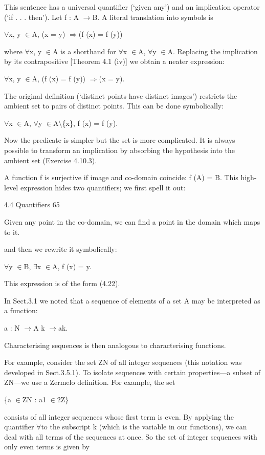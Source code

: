 \documentclass[11pt]{article}
\theoremstyle{plain}
\theoremstyle{definition}
\begin{document}
This sentence has a universal quantifier (`given any') and an implication operator (`if . . . then'). Let f : A $\to$B. A literal translation into symbols is

$\forall$x, y $\in$A, (x = y) $\Rightarrow$(f (x) = f (y))

where $\forall$x, y $\in$A is a shorthand for $\forall$x $\in$A, $\forall$y $\in$A. Replacing the implication by its contrapositive [Theorem 4.1 (iv)] we obtain a neater expression:

$\forall$x, y $\in$A, (f (x) = f (y)) $\Rightarrow$(x = y).

The original definition (`distinct points have distinct images') restricts the ambient set to pairs of distinct points. This can be done symbolically:

$\forall$x $\in$A, $\forall$y $\in$A$\setminus$\{x\}, f (x) = f (y).

Now the predicate is simpler but the set is more complicated. It is always possible to transform an implication by absorbing the hypothesis into the ambient set (Exercise 4.10.3).

A function f is surjective if image and co-domain coincide: f (A) = B. This high-level expression hides two quantifiers; we first spell it out:

4.4 Quantifiers 65

Given any point in the co-domain, we can find a point in the domain which maps to it.

and then we rewrite it symbolically:

$\forall$y $\in$B, $\exists$x $\in$A, f (x) = y.

This expression is of the form (4.22).

In Sect.3.1 we noted that a sequence of elements of a set A may be interpreted as a function:

a : N $\to$A k $\to$ak.

Characterising sequences is then analogous to characterising functions.

For example, consider the set ZN of all integer sequences (this notation was developed in Sect.3.5.1). To isolate sequences with certain properties---a subset of ZN---we use a Zermelo definition. For example, the set

\{a $\in$ZN : a1 $\in$2Z\}

consists of all integer sequences whose first term is even. By applying the quantifier $\forall$to the subscript k (which is the variable in our functions), we can deal with all terms of the sequences at once. So the set of integer sequences with only even terms is given by
\end{document}
